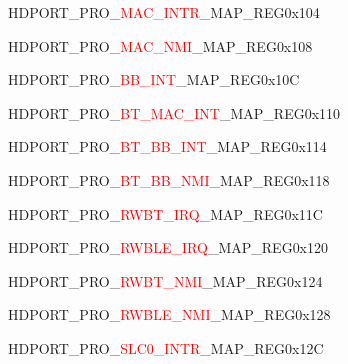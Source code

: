 \begin{register}{H}{DPORT\_PRO\_\textcolor{red}{MAC\_INTR}\_MAP\_REG}{0x104}\label{regdesc:PROMACINTRMAPREG}
\end{register}
\vspace{-3em}
\begin{register}{H}{DPORT\_PRO\_\textcolor{red}{MAC\_NMI}\_MAP\_REG}{0x108}\label{regdesc:PROMACNMIMAPREG}
\end{register}
\vspace{-3em}
\begin{register}{H}{DPORT\_PRO\_\textcolor{red}{BB\_INT}\_MAP\_REG}{0x10C}\label{regdesc:PROBBINTMAPREG}
\end{register}
\vspace{-3em}
\begin{register}{H}{DPORT\_PRO\_\textcolor{red}{BT\_MAC\_INT}\_MAP\_REG}{0x110}\label{regdesc:PROBTMACINTMAPREG}
\end{register}
\vspace{-3em}
\begin{register}{H}{DPORT\_PRO\_\textcolor{red}{BT\_BB\_INT}\_MAP\_REG}{0x114}\label{regdesc:PROBTBBINTMAPREG}
\end{register}
\vspace{-3em}
\begin{register}{H}{DPORT\_PRO\_\textcolor{red}{BT\_BB\_NMI}\_MAP\_REG}{0x118}\label{regdesc:PROBTBBNMIMAPREG}
\end{register}
\vspace{-3em}
\begin{register}{H}{DPORT\_PRO\_\textcolor{red}{RWBT\_IRQ}\_MAP\_REG}{0x11C}\label{regdesc:PRORWBTIRQMAPREG}
\end{register}
\vspace{-3em}
\begin{register}{H}{DPORT\_PRO\_\textcolor{red}{RWBLE\_IRQ}\_MAP\_REG}{0x120}\label{regdesc:PRORWBLEIRQMAPREG}
\end{register}
\vspace{-3em}
\begin{register}{H}{DPORT\_PRO\_\textcolor{red}{RWBT\_NMI}\_MAP\_REG}{0x124}\label{regdesc:PRORWBTNMIMAPREG}
\end{register}
\vspace{-3em}
\begin{register}{H}{DPORT\_PRO\_\textcolor{red}{RWBLE\_NMI}\_MAP\_REG}{0x128}\label{regdesc:PRORWBLENMIMAPREG}
\end{register}
\vspace{-3em}
\begin{register}{H}{DPORT\_PRO\_\textcolor{red}{SLC0\_INTR}\_MAP\_REG}{0x12C}\label{regdesc:PROSLC0INTRMAPREG}
\end{register}
